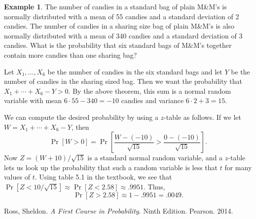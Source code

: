 \documentclass[12pt]{article}
\theoremstyle{plain}
\theoremstyle{definition}
\newtheorem{example}[theorem]{Example}
\theoremstyle{remark}
\begin{document}
\begin{example}
    The number of candies in a standard bag of plain M\&M's is normally distributed with a mean of 55 candies and a standard deviation of 2 candies.
    The number of candies in a sharing size bag of plain M\&M's is also normally distributed with a mean of 340 candies and a standard deviation of 3 candies.
    What is the probability that six standard bags of M\&M's together contain more candies than one sharing bag?

    Let $X_1, \ldots, X_6$ be the number of candies in the six standard bags and let $Y$ be the number of candies in the sharing sized bag.
    Then we want the probability that $X_1 + \cdots + X_6 - Y > 0$.
    By the above theorem, this sum is a normal random variable with mean $6\cdot 55 - 340 = -10$ candies and variance $6\cdot 2 + 3 = 15$.

    We can compute the desired probability by using a $z$-table as follows.
    If we let $W = X_1 + \cdots + X_6 - Y$, then
    \[
        \Pr[W > 0] = \Pr\left[\frac{W-(-10)}{\sqrt{15}} > \frac{0 - (-10)}{\sqrt{15}}\right].
    \]
    Now $Z = (W+10)/\sqrt{15}$ is a standard normal random variable, and a $z$-table lets us look up the probability that such a random variable is less that $t$ for many values of $t$.
    Using table 5.1 in the textbook, we see that $\Pr[Z < 10/\sqrt{15}] \approx \Pr[Z< 2.58] \approx  .9951$.
    Thus,
    \[
        \Pr[Z > 2.58] \approx 1- .9951 = .0049.
    \]
\end{example}



\begin{thebibliography}{13}

 Ross, Sheldon. \textit{A First Course in Probability}. Ninth Edition. Pearson. 2014.



 
\end{thebibliography}
\end{document}
